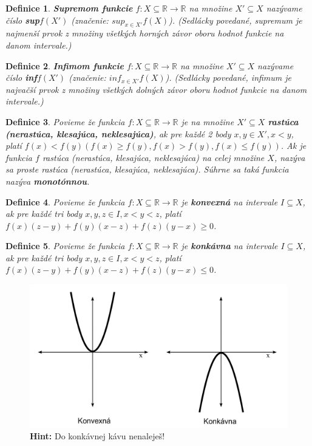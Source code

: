 \documentclass[12pt,a4paper]{article}
\newtheorem{definition}{Definice}
\begin{document}
\begin{definition}
	\textbf{Supremom funkcie} $f: X \subseteq \mathds{R} \rightarrow \mathds{R}$ na množine $X'\subseteq X$ nazývame číslo \textbf{sup}$f(X')$ (značenie: $sup_{x\in X'}f(X)$). (Sedlácky povedané, supremum je najmenší prvok z množiny všetkých horných závor oboru hodnot funkcie na danom intervale.)
\end{definition}

\begin{definition}
	\textbf{Infimom funkcie} $f: X \subseteq \mathds{R} \rightarrow \mathds{R}$ na množine $X'\subseteq X$ nazývame číslo \textbf{inf}$f(X')$ (značenie: $inf_{x\in X'}f(X)$). (Sedlácky povedané, infimum je najvačší prvok z množiny všetkých dolných závor oboru hodnot funkcie na danom intervale.)
\end{definition}

\begin{definition}
	Povieme že funkcia $f: X \subseteq \mathds{R} \rightarrow \mathds{R}$ je na množine $X'\subseteq X$ \textbf{rastúca (nerastúca, klesajúca, neklesajúca)}, ak pre každé 2 body $x, y \in X', x<y$, platí $f(x)<f(y) (f(x) \geq f(y), f(x)>f(y), f(x)\leq f(y))$. Ak je funkcia $f$ rastúca (nerastúca, klesajúca, neklesajúca) na celej množine $X$, nazýva sa proste rastúca (nerastúca, klesajúca, neklesajúca). Súhrne sa taká funkcia nazýva \textbf{monotónnou}.
\end{definition}

\begin{definition}
	Povieme že funkcia $f: X \subseteq \mathds{R} \rightarrow \mathds{R}$ je \textbf{konvexná} na intervale $I\subseteq X$, ak pre každé tri body $x, y, z\in I, x<y<z$, platí $f(x)(z-y)+f(y)(x-z)+f(z)(y-x)\geq 0$.
\end{definition}

\begin{definition}
	Povieme že funkcia $f: X \subseteq \mathds{R} \rightarrow \mathds{R}$ je \textbf{konkávna} na intervale $I\subseteq X$, ak pre každé tri body $x, y, z\in I, x<y<z$, platí $f(x)(z-y)+f(y)(x-z)+f(z)(y-x)\leq 0$.
\end{definition}

\begin{figure}[ht]
	\includegraphics[scale=0.53]{img/konvexna_konkavna}
	\caption{\textbf{Hint:} Do konkávnej kávu nenaleješ!}
\end{figure}
\end{document}
